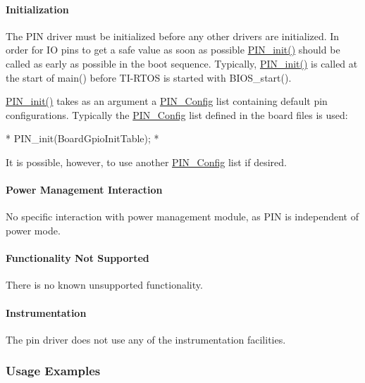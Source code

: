 \paragraph*{Initialization}

The P\-I\-N driver must be initialized before any other drivers are initialized. In order for I\-O pins to get a safe value as soon as possible \hyperlink{_p_i_n_8h_a0de1df98a14e6e13b16db414e54472ef}{P\-I\-N\-\_\-init()} should be called as early as possible in the boot sequence. Typically, \hyperlink{_p_i_n_8h_a0de1df98a14e6e13b16db414e54472ef}{P\-I\-N\-\_\-init()} is called at the start of main() before T\-I-\/\-R\-T\-O\-S is started with B\-I\-O\-S\-\_\-start().

\hyperlink{_p_i_n_8h_a0de1df98a14e6e13b16db414e54472ef}{P\-I\-N\-\_\-init()} takes as an argument a \hyperlink{_p_i_n_8h_ae427b7d2925f9b0f3145e455cfdb5841}{P\-I\-N\-\_\-\-Config} list containing default pin configurations. Typically the \hyperlink{_p_i_n_8h_ae427b7d2925f9b0f3145e455cfdb5841}{P\-I\-N\-\_\-\-Config} list defined in the board files is used\-: 
\begin{DoxyCode}
*  PIN_init(BoardGpioInitTable);
*  
\end{DoxyCode}
 It is possible, however, to use another \hyperlink{_p_i_n_8h_ae427b7d2925f9b0f3145e455cfdb5841}{P\-I\-N\-\_\-\-Config} list if desired.

\paragraph*{Power Management Interaction}

No specific interaction with power management module, as P\-I\-N is independent of power mode.

\paragraph*{Functionality Not Supported}

There is no known unsupported functionality.

\paragraph*{Instrumentation}

The pin driver does not use any of the instrumentation facilities.

\subsubsection*{Usage Examples}

